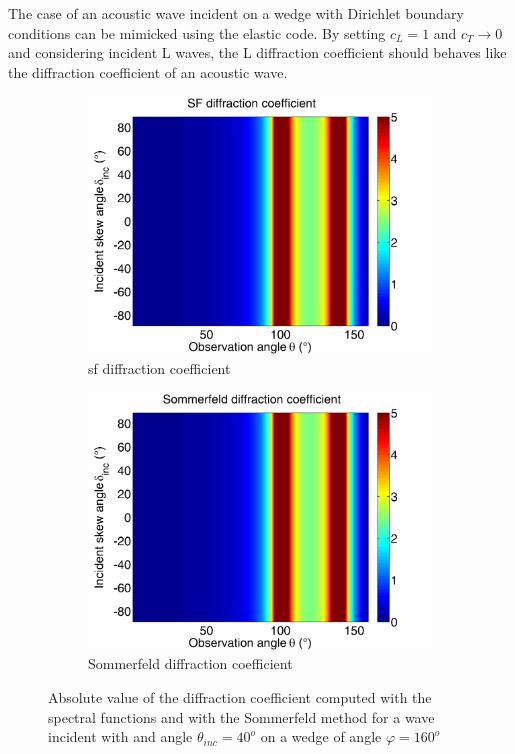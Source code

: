 The case of an acoustic wave incident on a wedge with Dirichlet boundary conditions can be mimicked using the elastic code. By setting $c_L=1$ and $c_T \rightarrow 0$ and considering incident L waves, the L diffraction coefficient should behaves like the diffraction coefficient of an acoustic wave. 

\begin{figure}
\centering
\begin{subfigure}[b]{0.49\textwidth}
        \includegraphics[width=\textwidth]{images/chapter4/Xprop_160_40.png}
        \caption{\acrshort{sf} diffraction coefficient}
        \label{C4:acSF16040}
    \end{subfigure}
\begin{subfigure}[b]{0.49\textwidth}
        \includegraphics[width=\textwidth]{images/chapter4/Sommerfeld_160_40.png}
        \caption{Sommerfeld diffraction coefficient}
        \label{C4:Som16040}
    \end{subfigure}
\caption{Absolute value of the diffraction coefficient computed with the spectral functions and with the Sommerfeld method for a wave incident with and angle $\theta_{inc}=40^o$ on a wedge of angle $\varphi=160^o$}
\label{C4:ac16040}
\end{figure}

